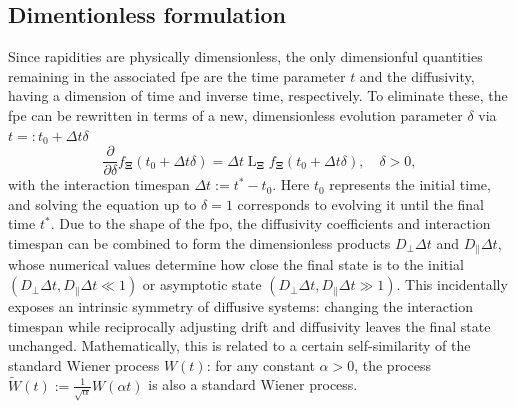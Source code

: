 \documentclass[a4paper,12pt]{book}
\begin{document}
\subsection{Dimentionless formulation}
Since rapidities are physically dimensionless, the only dimensionful quantities remaining in the associated \acrshort{fpe} are the time parameter $t$ and the diffusivity, having a dimension of time and inverse time, respectively. To eliminate these, the \acrshort{fpe} can be rewritten in terms of a new, dimensionless evolution parameter $\delta$ via $t=: t_0+\Delta t \delta$
\begin{equation}
    \frac{\partial}{\partial \delta} f_{\bm{\Xi}}(t_0+\Delta t \delta)=\Delta t \operatorname{L}_{\bm{\Xi}} f_{\bm{\Xi}}(t_0+\Delta t \delta), \quad \delta>0,
\end{equation}
with the interaction timespan $\Delta t:=t^*-t_0$. Here $t_0$ represents the initial time, and solving the equation up to $\delta=1$ corresponds to evolving it until the final time $t^*$.
Due to the shape of the \acrshort{fpo}, the diffusivity coefficients and interaction timespan can be combined to form the dimensionless products $D_{\perp} \Delta t$ and $D_{\|} \Delta t$, whose numerical values determine how close the final state is to the initial $\left(D_{\perp} \Delta t, D_{\|} \Delta t \ll 1\right)$ or asymptotic state $\left(D_{\perp} \Delta t, D_{\|} \Delta t \gg 1\right)$. This incidentally exposes an intrinsic symmetry of diffusive systems: changing the interaction timespan while reciprocally adjusting drift and diffusivity leaves the final state unchanged. Mathematically, this is related to a certain self-similarity of the standard Wiener process $W(t)$: for any constant $\alpha>0$, the process $\widetilde{W}(t):=\frac{1}{\sqrt{\alpha}} W(\alpha t)$ is also a standard Wiener process.
\\
\end{document}
